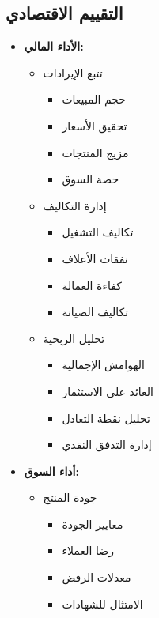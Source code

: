 \subsection{التقييم الاقتصادي}
\begin{itemize}
    \item \textbf{الأداء المالي:}
    \begin{itemize}
        \item تتبع الإيرادات
        \begin{itemize}
            \item حجم المبيعات
            \item تحقيق الأسعار
            \item مزيج المنتجات
            \item حصة السوق
        \end{itemize}
        
        \item إدارة التكاليف
        \begin{itemize}
            \item تكاليف التشغيل
            \item نفقات الأعلاف
            \item كفاءة العمالة
            \item تكاليف الصيانة
        \end{itemize}
        
        \item تحليل الربحية
        \begin{itemize}
            \item الهوامش الإجمالية
            \item العائد على الاستثمار
            \item تحليل نقطة التعادل
            \item إدارة التدفق النقدي
        \end{itemize}
    \end{itemize}
    
    \item \textbf{أداء السوق:}
    \begin{itemize}
        \item جودة المنتج
        \begin{itemize}
            \item معايير الجودة
            \item رضا العملاء
            \item معدلات الرفض
            \item الامتثال للشهادات
        \end{itemize}
        

\end{itemize}
\end{itemize}
